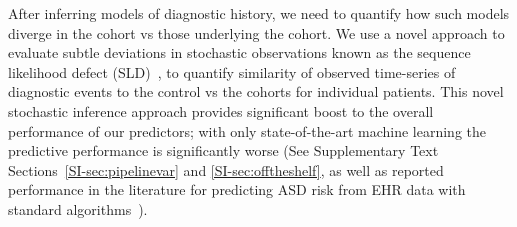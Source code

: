 \documentclass[onecolumn,10pt]{IEEEtran}
\begin{document}
After inferring  models of diagnostic history, we need to quantify how such models diverge in the \treatment cohort vs those underlying the \control cohort.
We use a novel approach to evaluate subtle deviations in stochastic observations known as the sequence likelihood defect (SLD)~\cite{huang2019data}, to  quantify similarity of observed time-series of diagnostic events to the control vs the \treatment cohorts for individual patients. This novel stochastic inference approach provides  significant boost to the overall performance of our predictors; with only state-of-the-art machine learning  the predictive performance is significantly worse (See Supplementary Text Sections~\ref{SI-sec:pipelinevar} and \ref{SI-sec:offtheshelf}, as well as reported performance in the literature for predicting ASD risk from EHR data with standard algorithms~\cite{lingren2016electronic}).
\end{document}
